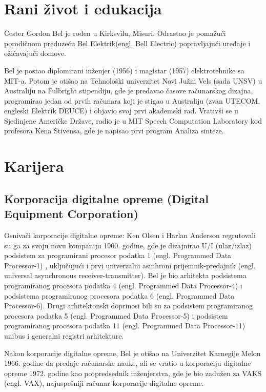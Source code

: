 \documentclass[a4paper]{article}
\begin{document}
{\section{Rani život i edukacija}
\label{sec:uvod}
Čester Gordon Bel je rođen u Kirksvilu, Misuri. Odrastao je pomažući porodičnom preduzeću Bel Elektrik(engl. Bell Electric) popravljajući uređaje i ožičavajući domove\cite{bel1}.

Bel je postao diplomirani inženjer (1956) i magistar (1957) elektrotehnike sa MIT-a. Potom je otišao na Tehnološki univerzitet Novi Južni Vels (sada UNSV) u Australiju na Fulbright stipendiju, gde je predavao časove računarskog dizajna, programirao jedan od prvih računara koji je stigao u Australiju (zvan UTECOM, engleski Elektrik DEUCE) i objavio svoj prvi akademski rad. Vrativši se u Sjedinjene Američke Države, radio je u MIT Speech Computation Laboratory kod profesora Kena Stivensa, gde je napisao prvi program Analiza sinteze.

\section{Karijera}
\subsection{Korporacija digitalne opreme (Digital Equipment Corporation)}
\label{subsec:podnaslov1}

Osnivači korporacije digitalne opreme: Ken Olsen i Harlan Anderson regrutovali su ga za svoju novu kompaniju 1960. godine, gde je dizajnirao U/I (ulaz/izlaz) podsistem za programirani procesor podatka 1 (engl. Programmed Data Processor-1) , uključujući i prvi univerzalni asinhroni prijemnik-predajnik (engl. universal asynchronous receiver-transmitter). Bel je bio arhitekta podsistema programiranog procesora podatka 4 (engl. Programmed Data Processor-4) i podsistema programiranog procesora podatka 6 (engl. Programmed Data Processor-6). Drugi arhitektonski doprinosi bili su za podsistem programiranog procesora podatka 5 (engl. Programmed Data Processor-5) i podsistem programiranog procesora podatka 11 (engl. Programmed Data Processor-11) unibus i generalni registri arhitekture. \cite{bel2}

Nakon korporacije digitalne opreme, Bel je otišao na Univerzitet Karnegije Melon 1966. godine da predaje računarske nauke, ali se vratio u korporaciju digitalne opreme 1972. godine kao potpredsednik inženjerstva, gde je bio zadužen za VAKS (engl. VAX), najuspešniji računar korporacije digitalne opreme.

}
\end{document}
